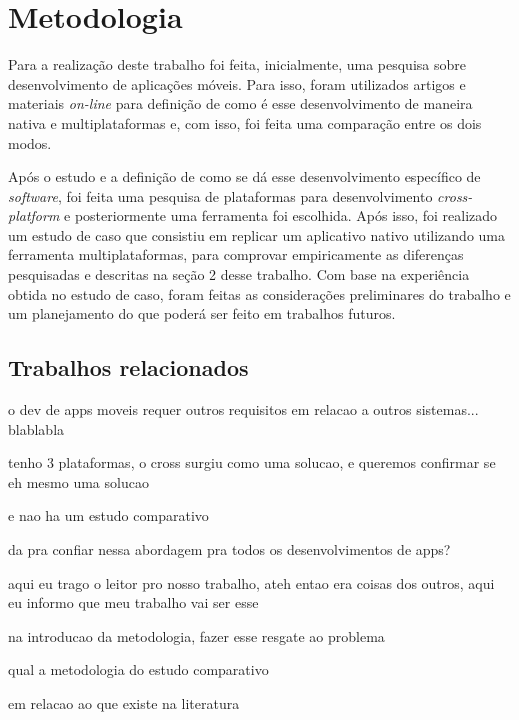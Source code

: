 \chapter{Metodologia} \label{metodologia}
Para a realização deste trabalho foi feita, inicialmente, uma pesquisa sobre desenvolvimento de aplicações móveis. 
Para isso, foram utilizados artigos e materiais \textit{on-line} para definição de como é esse desenvolvimento
de maneira nativa e multiplataformas e, com isso, foi feita uma comparação entre os dois modos. 


Após o estudo e a definição de como se dá esse desenvolvimento específico de \textit{software},
foi feita uma pesquisa de plataformas para desenvolvimento \textit{cross-platform} e posteriormente uma ferramenta foi escolhida. Após isso, foi realizado um estudo de caso que
consistiu em replicar um aplicativo nativo utilizando uma ferramenta multiplataformas, para comprovar empiricamente as diferenças pesquisadas e descritas na seção 2 desse trabalho. 
Com base na experiência obtida no estudo de caso, foram feitas as considerações preliminares
do trabalho e um planejamento do que poderá ser feito em trabalhos futuros.

\section{Trabalhos relacionados} \label{subsec:trabalhos_relacionados}
o dev de apps moveis requer outros requisitos em relacao a outros sistemas... blablabla

tenho 3 plataformas, o cross surgiu como uma solucao, e queremos confirmar se eh mesmo uma solucao

e nao ha um estudo comparativo

da pra confiar nessa abordagem pra todos os desenvolvimentos de apps?

aqui eu trago o leitor pro nosso trabalho, ateh entao era coisas dos outros, aqui eu informo que meu trabalho vai ser esse

na introducao da metodologia, fazer esse resgate ao problema

qual a metodologia do estudo comparativo

em relacao ao que existe na literatura

